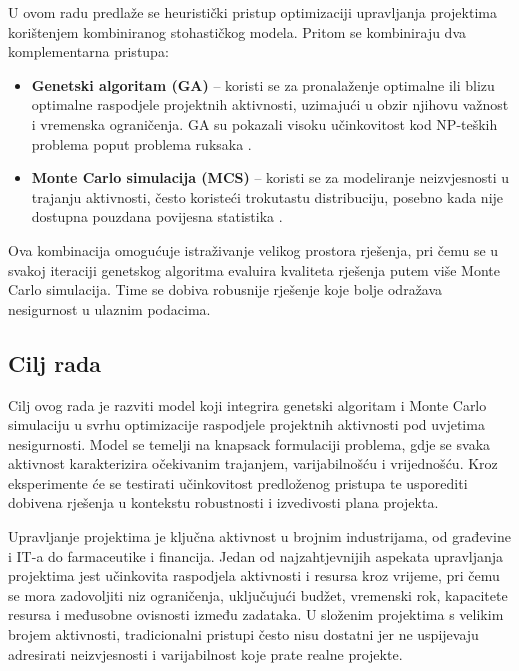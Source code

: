U ovom radu predlaže se heuristički pristup optimizaciji upravljanja projektima korištenjem kombiniranog stohastičkog modela. Pritom se kombiniraju dva komplementarna pristupa:

\begin{itemize}
    \item \textbf{Genetski algoritam (GA)} – koristi se za pronalaženje optimalne ili blizu optimalne raspodjele projektnih aktivnosti, uzimajući u obzir njihovu važnost i vremenska ograničenja. GA su pokazali visoku učinkovitost kod NP-teških problema poput problema ruksaka \cite{Goldberg1989, Mitchell1998}.
    \item \textbf{Monte Carlo simulacija (MCS)} – koristi se za modeliranje neizvjesnosti u trajanju aktivnosti, često koristeći trokutastu distribuciju, posebno kada nije dostupna pouzdana povijesna statistika \cite{Law2015}.
\end{itemize}

Ova kombinacija omogućuje istraživanje velikog prostora rješenja, pri čemu se u svakoj iteraciji genetskog algoritma evaluira kvaliteta rješenja putem više Monte Carlo simulacija. Time se dobiva robusnije rješenje koje bolje odražava nesigurnost u ulaznim podacima.

\subsection{Cilj rada}

Cilj ovog rada je razviti model koji integrira genetski algoritam i Monte Carlo simulaciju u svrhu optimizacije raspodjele projektnih aktivnosti pod uvjetima nesigurnosti. Model se temelji na knapsack formulaciji problema, gdje se svaka aktivnost karakterizira očekivanim trajanjem, varijabilnošću i vrijednošću. Kroz eksperimente će se testirati učinkovitost predloženog pristupa te usporediti dobivena rješenja u kontekstu robustnosti i izvedivosti plana projekta.


Upravljanje projektima je ključna aktivnost u brojnim industrijama, od građevine i IT-a do farmaceutike i financija. Jedan od najzahtjevnijih aspekata upravljanja projektima jest učinkovita raspodjela aktivnosti i resursa kroz vrijeme, pri čemu se mora zadovoljiti niz ograničenja, uključujući budžet, vremenski rok, kapacitete resursa i međusobne ovisnosti između zadataka. U složenim projektima s velikim brojem aktivnosti, tradicionalni pristupi često nisu dostatni jer ne uspijevaju adresirati neizvjesnosti i varijabilnost koje prate realne projekte.

